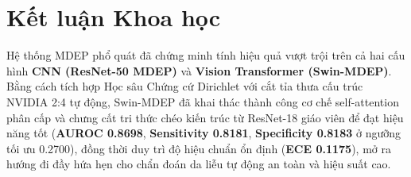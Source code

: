 \documentclass[11pt, a4paper]{article}
\begin{document}
\section{Kết luận Khoa học}
Hệ thống MDEP phổ quát đã chứng minh tính hiệu quả vượt trội trên cả hai cấu hình \textbf{CNN (ResNet-50 MDEP)} và \textbf{Vision Transformer (Swin-MDEP)}. Bằng cách tích hợp Học sâu Chứng cứ Dirichlet với cắt tỉa thưa cấu trúc NVIDIA 2:4 tự động, Swin-MDEP đã khai thác thành công cơ chế self-attention phân cấp và chưng cất tri thức chéo kiến trúc từ ResNet-18 giáo viên để đạt hiệu năng tốt (\textbf{AUROC 0.8698}, \textbf{Sensitivity 0.8181}, \textbf{Specificity 0.8183} ở ngưỡng tối ưu 0.2700), đồng thời duy trì độ hiệu chuẩn ổn định (\textbf{ECE 0.1175}), mở ra hướng đi đầy hứa hẹn cho chẩn đoán da liễu tự động an toàn và hiệu suất cao.
\end{document}
